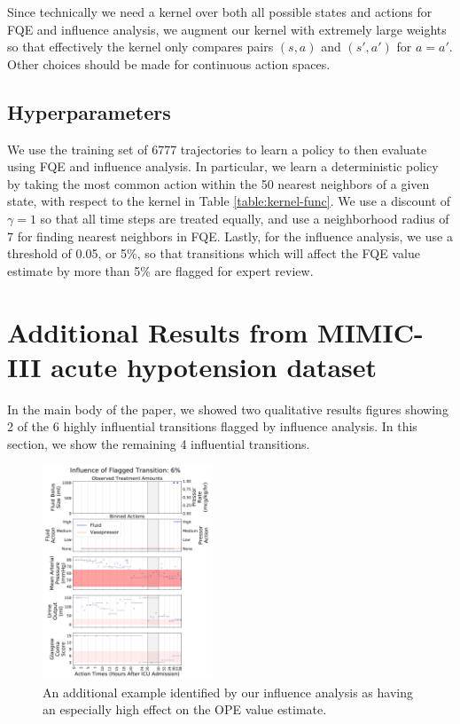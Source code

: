 \documentclass{article}
\begin{document}
Since technically we need a kernel over both all possible states and actions for FQE and influence analysis, we augment our kernel with extremely large weights so that effectively the kernel only compares pairs $(s,a)$ and $(s',a')$ for $a=a'$. Other choices should be made for continuous action spaces.

\subsection{Hyperparameters}

We use the training set of 6777 trajectories to learn a policy to then evaluate using FQE and influence analysis. In particular, we learn a deterministic policy by taking the most common action within the 50 nearest neighbors of a given state, with respect to the kernel in Table \ref{table:kernel-func}. We use a discount of $\gamma=1$ so that all time steps are treated equally, and use a neighborhood radius of 7 for finding nearest neighbors in FQE. Lastly, for the influence analysis, we use a threshold of 0.05, or 5\%, so that transitions which will affect the FQE value estimate by more than 5\% are flagged for expert review.


\section{Additional Results from MIMIC-III acute hypotension dataset}
\label{sec:additional-mimic-results}

In the main body of the paper, we showed two qualitative results figures showing 2 of the 6 highly influential transitions flagged by influence analysis. In this section, we show the remaining 4 influential transitions. 

\begin{figure}[H]
\centering
\includegraphics[width=0.45\textwidth]{ID-201525_trans-9.pdf}
\caption{An additional example identified by our influence analysis as having an especially high effect on the OPE value estimate.} 
\label{fig:mimic-9}
\end{figure}
\end{document}
